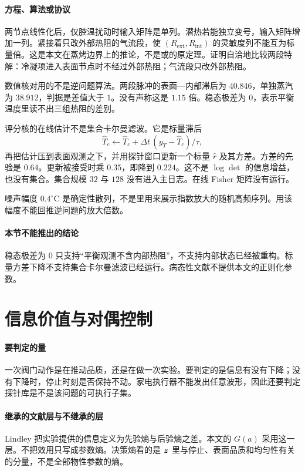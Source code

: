 \paragraph{方程、算法或协议}
两节点线性化后，仅腔温扰动时输入矩阵是单列。潜热若能独立变号，输入矩阵增加一列。紧接着只改外部热阻的气流段，使 $(R_{\mathrm{ext}},R_{\mathrm{int}})$ 的灵敏度列不能互为标量倍。这是本文在蒸烤边界上的推论，不是\cite{ozisik2000}或\cite{evensen2003}的原定理。证明自洽地比较两段特解：冷凝项进入表面节点时不经过外部热阻；气流段只改外部热阻。

数值核对用的不是逆问题算法。两段脉冲的表面—内部滞后为 $40.846$，单独蒸汽为 $38.912$，判据是差值大于 $1$。没有声称这是 $1.15$ 倍。稳态极差为 $0$，表示平衡温度里读不出三组热阻的差别。

评分核的在线估计不是集合卡尔曼滤波。它是标量滞后
\[
\widehat T_c\leftarrow\widehat T_c+\Delta t\,(y_T-\widehat T_c)/\tau,
\]
再把估计压到表面观测之下，并用探针窗口更新一个标量 $\hat r$ 及其方差。方差的先验是 $0.64$。更新被接受时乘 $0.35$，即降到 $0.224$。这不是 $\log\det$ 的信息增益，也没有集合。集合规模 $32$ 与 $128$ 没有进入主日志。在线 Fisher 矩阵没有运行。

噪声幅度 $0.4^\circ\mathrm{C}$ 是确定性散列，不是\cite{ozisik2000}里用来展示指数放大的随机高频序列。用该幅度不能回推逆问题的放大倍数。

\paragraph{本节不能推出的结论}
稳态极差为 $0$ 只支持“平衡观测不含内部热阻”，不支持内部状态已经被重构。标量方差下降不支持集合卡尔曼滤波已经运行。病态性文献不提供本文的正则化参数。

\section{信息价值与对偶控制}

\paragraph{要判定的量}
一次阀门动作是在推动品质，还是在做一次实验。要判定的是信息有没有下降；没有下降时，停止时刻是否保持不动。家电执行器不能发出任意波形，因此还要判定探针库是不是该问题的可执行子集。

\paragraph{继承的文献层与不继承的层}
Lindley 把实验提供的信息定义为先验熵与后验熵之差\cite{lindley1956}。本文的 $G(a)$ 采用这一层。不把效用只写成参数熵。决策熵看的是 $\bm{z}$ 里与停止、表面品质和均匀性有关的分量，不是全部物性参数的熵。

